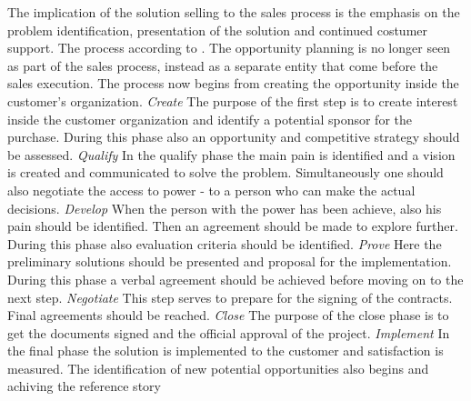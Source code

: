 \documentclass[12pt,a4paper,oneside,pdftex]{report}
\begin{document}
The implication of the solution selling to the sales process is the emphasis on the problem identification, presentation of the solution and continued costumer support. The process according to \citep{Eades}. The opportunity planning is no longer seen as part of the sales process, instead as a separate entity that come before the sales execution. The process now begins from creating the opportunity inside the customer's organization. \newline \newline\emph{Create}\newline 
The purpose of the first step is to create interest inside the customer organization and identify a potential sponsor for the purchase. During this phase also an opportunity and competitive strategy should be assessed. \citep{Eades}\newline \newline
\emph{Qualify}\newline 
In the qualify phase the main pain is identified and a vision is created and communicated to solve the problem. Simultaneously one should also negotiate the access to power - to a person who can make the actual decisions. 
 \citep{Eades}\newline \newline
\emph{Develop}\newline
When the person with the power has been achieve, also his pain should be identified. Then an agreement should be made to explore further. During this phase also evaluation criteria should be identified. 
\citep{Eades} \newline \newline
\emph{Prove}\newline
Here the preliminary solutions should be presented and proposal for the implementation. During this phase a verbal agreement should be achieved before moving on to the next step.  \citep{Eades}\newline \newline
\emph{Negotiate}\newline
This step serves to prepare for the signing of the contracts. Final agreements should be reached. \citep{Eades}\newline \newline
\emph{Close}\newline
The purpose of the close phase is to get the documents signed and the official approval of the project. \citep{Eades} \newline \newline
\emph{Implement}\newline
In the final phase the solution is implemented to the customer and satisfaction is measured. The identification of new potential opportunities also begins and achiving the reference story \citep{Eades}
\newline
\end{document}
